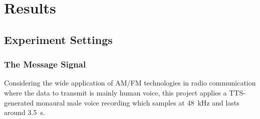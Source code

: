 \documentclass[../ECE459FinalProjectReport.tex]{subfiles}
\begin{document}
\chapter{Results}
\section{Experiment Settings}
\subsection{The Message Signal}
Considering the wide application of AM/FM technologies in radio communication where the data to transmit is mainly human voice, this project applies a TTS-generated monaural male voice recording which samples at \SI{48}{kHz} and lasts around \SI{3.5}{s}.
\end{document}
